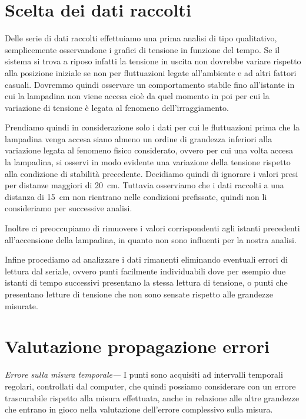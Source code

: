 \documentclass[
    rmp,
    reprint, 
    superscriptaddress, 
    altaffilletter, 
    amsmath, 
    amssymb,
    a4paper]{revtex4-2}
\begin{document}
\section*{Scelta dei dati raccolti}
Delle serie di dati raccolti effettuiamo una prima analisi di tipo qualitativo, semplicemente osservandone i grafici di tensione in funzione del tempo. Se il sistema si trova a riposo infatti la tensione in uscita non dovrebbe variare rispetto alla posizione iniziale se non per fluttuazioni legate all'ambiente e ad altri fattori casuali. Dovremmo quindi osservare un comportamento stabile fino all'istante in cui la lampadina non viene accesa cioè da quel momento in poi per cui la variazione di tensione è legata al fenomeno dell'irraggiamento. 

Prendiamo quindi in considerazione solo i dati per cui le fluttuazioni prima che la lampadina venga accesa siano almeno un ordine di grandezza inferiori alla variazione legata al fenomeno fisico considerato, ovvero per cui una volta accesa la lampadina, si osservi in modo evidente una variazione della tensione rispetto alla condizione di stabilità precedente. Decidiamo quindi di ignorare i valori presi per distanze maggiori di \SI{20}{\centi\metre}. Tuttavia  osserviamo che i dati raccolti a una distanza di \SI{15}{\centi\metre} non rientrano nelle condizioni prefissate, quindi non li consideriamo per successive analisi. 

Inoltre ci preoccupiamo di rimuovere i valori corrispondenti agli istanti precedenti all'accensione della lampadina, in quanto non sono influenti per la nostra analisi.

Infine procediamo ad analizzare i dati rimanenti eliminando eventuali errori di lettura dal seriale, ovvero punti facilmente individuabili dove per esempio due istanti di tempo successivi presentano la stessa lettura di tensione, o punti che presentano letture di tensione che non sono sensate rispetto alle grandezze misurate. 

\section*{Valutazione propagazione errori}

\noindent\textit{Errore sulla misura temporale---}
I punti sono acquisiti ad intervalli temporali regolari, controllati dal computer, che quindi possiamo considerare con un errore trascurabile rispetto alla misura effettuata, anche in relazione alle altre grandezze che entrano in gioco nella valutazione dell'errore complessivo sulla misura.
\end{document}
